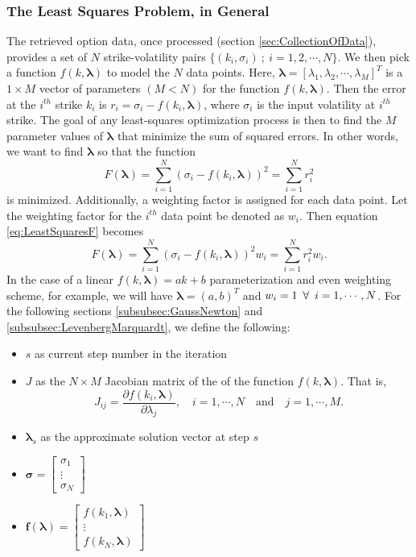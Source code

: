 \documentclass[12pt, a4paper, notitlepage]{article}
\numberwithin{equation}{subsection}
\numberwithin{figure}{subsection}
\numberwithin{table}{subsection}
\newcommand{\newpar}{\newline \newline}
\newcommand{\lambdaVect}{\pmb{\lambda}}
\begin{document}
\subsubsection{The Least Squares Problem, in General}
The retrieved option data, once processed (section \ref{sec:CollectionOfData}), provides a set of $N$ strike-volatility pairs $\{(k_i,\sigma_i) \ ; \ i = 1,2,\cdots,N\}$.  We then pick a function $f(k,\lambdaVect)$ to model the $N$ data points.  Here, $\lambdaVect = [\lambda_1, \lambda_2, \cdots, \lambda_M]^T$ is a $1 \times M$ vector of parameters $(M < N)$ for the function $f(k,\lambdaVect)$.  Then the error at the $i^{th}$ strike $k_i$ is $r_i = \sigma_i - f(k_i, \lambdaVect)$, where $\sigma_i$ is the input volatility at $i^{th}$ strike.
\newpar
The goal of any least-squares optimization process is then to find the $M$ parameter values of $\lambdaVect$ that minimize the sum of squared errors.  In other words, we want to find $\lambdaVect$ so that the function
\begin{equation}
	F(\lambdaVect) = \sum_{i=1}^{N}(\sigma_i - f(k_i,\lambdaVect))^2 = \sum_{i=1}^{N}r_i^2
    \label{eq:LeastSquaresF}
\end{equation}
is minimized.
\newpar
Additionally, a weighting factor is assigned for each data point.  Let the weighting factor for the $i^{th}$ data point be denoted as $w_i$.  Then equation \ref{eq:LeastSquaresF} becomes
\begin{equation}
	F(\lambdaVect) = \sum_{i=1}^{N}(\sigma_i - f(k_i,\lambdaVect))^2 w_i = \sum_{i=1}^{N}r_i^2 w_i.
    \label{eq:LeastSquaresFWeighted}
\end{equation}
In the case of a linear $f(k,\lambdaVect) = ak + b$ parameterization and even weighting scheme, for example, we will have $\lambdaVect = (a, b)^T$ and $w_i = 1 \enskip \forall \enskip i = 1, \cdots, N$.
\newpar
For the following sections \ref{subsubsec:GaussNewton} and \ref{subsubsec:LevenbergMarquardt}, we define the following:

\begin{itemize}
\item $s$ as current step number in the iteration 
\item $J$ as the $N \times M$ Jacobian matrix of the of the function $f(k,\lambdaVect)$.  That is, 
\begin{equation*}
	J_{ij} = \frac{\partial f(k_i,\lambdaVect)}{\partial \lambda_j}, \quad i = 1,\cdots, N \quad \text{and} \quad j = 1,\cdots, M.
\end{equation*}
\item $\lambdaVect_s$ as the approximate solution vector at step $s$
\item $\pmb{\sigma} = \begin{bmatrix} \sigma_1 \\ \vdots \\ \sigma_N \end{bmatrix}$
\item $\pmb{f}(\lambdaVect) = \begin{bmatrix} f(k_1,\lambdaVect) \\ \vdots \\ f(k_N,\lambdaVect) \end{bmatrix}$
\end{itemize}
\end{document}
